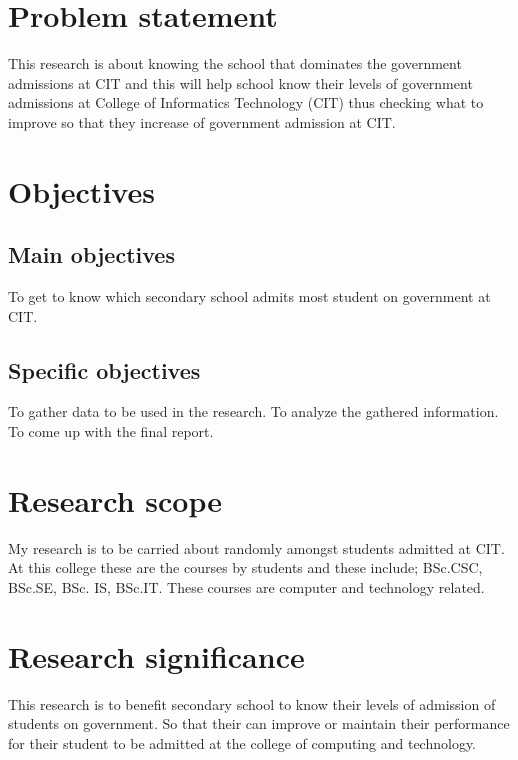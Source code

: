 \documentclass[12]{article}
\begin{document}
\section{Problem statement}
This research is about knowing the school that dominates the government                                                                                                                                                                                                              admissions at CIT and this will help school know their levels of government admissions at College of Informatics Technology (CIT) thus checking what to improve so that they increase of government admission at CIT.   
\section{Objectives}
\subsection{Main objectives}
To get to know which secondary school admits most student on government at CIT.
\subsection{Specific objectives}
To gather data to be used in the research.
To analyze the gathered information.
To come up with the final report.

\section{Research scope}
My research  is to be carried about randomly amongst students admitted at CIT. At this college these are the courses by students and these include; BSc.CSC, BSc.SE, BSc. IS, BSc.IT. These courses are computer and technology related.
\section{Research significance}
This research is to benefit secondary school to know their levels of admission of students on government. So that their can improve or maintain their performance for their student to be admitted at the college of computing and technology.
\end{document}
